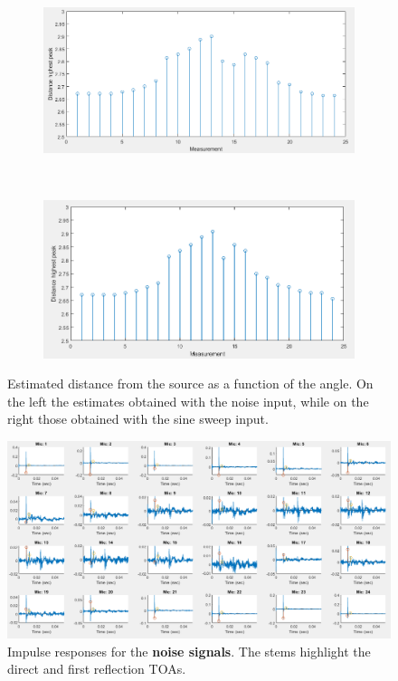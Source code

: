 \documentclass[a4paper]{article}
\begin{document}
\begin{figure}[h]
	\centering
	\begin{subfigure}{0.47\linewidth}
		\centering
		\includegraphics[width=0.9\linewidth]{noise_distance.png}
	\end{subfigure}
	~
	\begin{subfigure}{0.47\linewidth}
		\centering
		\includegraphics[width=0.9\linewidth]{sweep_distance.png}
	\end{subfigure}
	\caption{Estimated distance from the source as a function of the angle. On the left the estimates obtained with the noise input, while on the right those obtained with the sine sweep input.}
	\label{fig:distance}
\end{figure}



\begin{figure}[h]
	\centering
	\includegraphics[width=0.85\linewidth]{noise_ir.png}
	\caption{Impulse responses for the \textbf{noise signals}. The stems highlight the direct and first reflection TOAs.}
	\label{fig:noiseir}
\end{figure}
\end{document}
